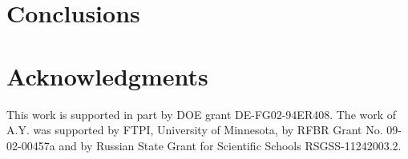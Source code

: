 \documentclass[12pt]{article}
\begin{document}
	
\section{Conclusions}
	
	
\section*{Acknowledgments}
This work  is supported in part by DOE grant DE-FG02-94ER408. 
The work of A.Y. was  supported 
by  FTPI, University of Minnesota, 
by RFBR Grant No. 09-02-00457a 
and by Russian State Grant for 
Scientific Schools RSGSS-11242003.2.


%
%
\small
\end{document}
